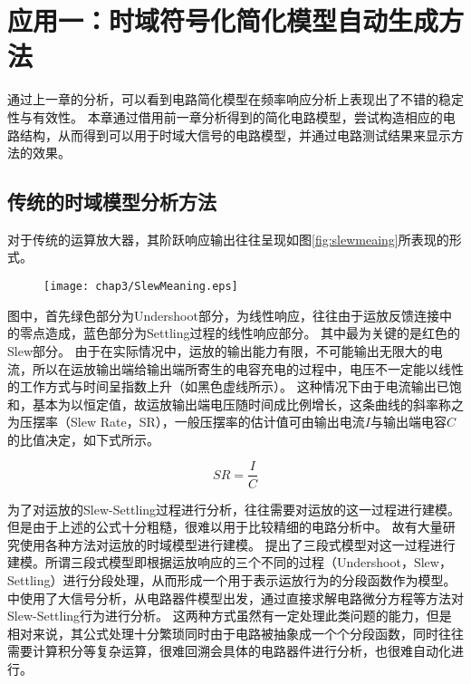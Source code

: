 \chapter{应用一：时域符号化简化模型自动生成方法}
\label{chap:time}

通过上一章的分析，可以看到电路简化模型在频率响应分析上表现出了不错的稳定性与有效性。
本章通过借用前一章分析得到的简化电路模型，尝试构造相应的电路结构，从而得到可以用于时域大信号的电路模型，并通过电路测试结果来显示方法的效果。

\section{传统的时域模型分析方法}
\label{sec:time:origin}

对于传统的运算放大器，其阶跃响应输出往往呈现如图\ref{fig:slewmeaing}所表现的形式。

\begin{figure}[!htp]
	\centering
	\texttt{[image: chap3/SlewMeaning.eps]}
\end{figure}

图中，首先绿色部分为Undershoot部分，为线性响应，往往由于运放反馈连接中的零点造成，蓝色部分为Settling过程的线性响应部分。
其中最为关键的是红色的Slew部分。
由于在实际情况中，运放的输出能力有限，不可能输出无限大的电流，所以在运放输出端给输出端所寄生的电容充电的过程中，电压不一定能以线性的工作方式与时间呈指数上升（如黑色虚线所示）。
这种情况下由于电流输出已饱和，基本为以恒定值，故运放输出端电压随时间成比例增长，这条曲线的斜率称之为压摆率（Slew Rate，SR），一般压摆率的估计值可由输出电流$I$与输出端电容$C$的比值决定，如下式所示。

\begin{equation}
SR = \frac{I}{C}
\end{equation}

为了对运放的Slew-Settling过程进行分析，往往需要对运放的这一过程进行建模。
但是由于上述的公式十分粗糙，很难以用于比较精细的电路分析中。
故有大量研究使用各种方法对运放的时域模型进行建模。
\parencite{Pug-3Segment-2010}提出了三段式模型对这一过程进行建模。所谓三段式模型即根据运放响应的三个不同的过程（Undershoot，Slew，Settling）进行分段处理，从而形成一个用于表示运放行为的分段函数作为模型。
\parencite{Yavari-TSSlew-2005,Rezaee-FCSlew-2009}中使用了大信号分析，从电路器件模型出发，通过直接求解电路微分方程等方法对Slew-Settling行为进行分析。
这两种方式虽然有一定处理此类问题的能力，但是相对来说，其公式处理十分繁琐同时由于电路被抽象成一个个分段函数，同时往往需要计算积分等复杂运算，很难回溯会具体的电路器件进行分析，也很难自动化进行。

